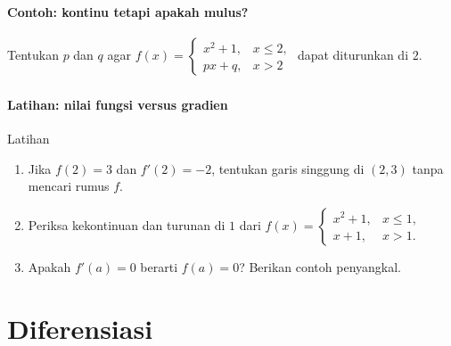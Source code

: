 \documentclass{../../kalkulus-ppt}
\begin{document}
\begin{frame}
\frametitle{\insertsection}
\framesubtitle{Contoh: kontinu tetapi apakah mulus?}

\begin{contoh}
Tentukan $p$ dan $q$ agar $f(x)=\begin{cases}x^2+1,&x\le2,\\px+q,&x>2\end{cases}$
dapat diturunkan di $2$.
\end{contoh}
\end{frame}


\begin{frame}
\frametitle{\insertsection}
\framesubtitle{Latihan: nilai fungsi versus gradien}

\begin{exampleblock}{Latihan}
\begin{enumerate}
\item Jika $f(2)=3$ dan $f'(2)=-2$, tentukan garis singgung di $(2,3)$ tanpa mencari rumus $f$.
\item Periksa kekontinuan dan turunan di $1$ dari
$f(x)=\begin{cases}x^2+1,&x\le1,\\x+1,&x>1.\end{cases}$
\item Apakah $f'(a)=0$ berarti $f(a)=0$? Berikan contoh penyangkal.
\end{enumerate}
\end{exampleblock}
\end{frame}


\section{Diferensiasi}
\end{document}
